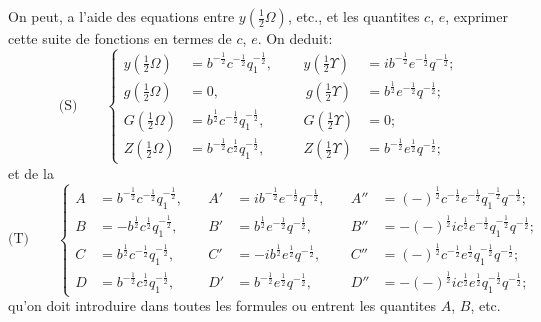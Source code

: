 \documentclass[11pt,a4paper]{article}
\begin{document}
On peut, a l'aide des equations entre $y\left(\frac{1}{2}\Omega\right)$, etc., et les quantites $c$, $e$, exprimer
cette suite de fonctions en termes de $c$, $e$. On deduit:
\begin{equation*}
\text{(S)}\qquad
\left\{
\begin{alignedat}{2}
y\left(\tfrac{1}{2}\Omega\right) &= b^{-\frac{1}{2}} c^{-\frac{1}{2}} q_1^{-\frac{1}{2}},\quad
&y\left(\tfrac{1}{2}\Upsilon\right) &= ib^{-\frac{1}{2}} e^{-\frac{1}{2}} q^{-\frac{1}{2}};\\
g\left(\tfrac{1}{2}\Omega\right) &= 0,\qquad\qquad\quad\,
&\, g\left(\tfrac{1}{2}\Upsilon\right) &= b^{\frac{1}{2}} e^{-\frac{1}{2}} q^{-\frac{1}{2}};\\
G\left(\tfrac{1}{2}\Omega\right) &= b^{\frac{1}{2}} c^{-\frac{1}{2}} q_1^{-\frac{1}{2}},\quad
&G\left(\tfrac{1}{2}\Upsilon\right) &= 0;\\
Z\left(\tfrac{1}{2}\Omega\right) &= b^{-\frac{1}{2}} c^{\frac{1}{2}} q_1^{-\frac{1}{2}},\quad
&Z\left(\tfrac{1}{2}\Upsilon\right) &= b^{-\frac{1}{2}} e^{\frac{1}{2}} q^{-\frac{1}{2}};
\end{alignedat}
\right.
\end{equation*}
et de la
\begin{equation*}
\text{(T)}\qquad
\left\{
\begin{alignedat}{3}
A &= b^{-\frac{1}{2}} c^{-\frac{1}{2}} q_1^{-\frac{1}{2}},\quad &A' &= ib^{-\frac{1}{2}} e^{-\frac{1}{2}} q^{-\frac{1}{2}},\quad &A'' &= (-)^{\frac{1}{2}} c^{-\frac{1}{2}} e^{-\frac{1}{2}} q_1^{-\frac{1}{2}} q^{-\frac{1}{2}};\\
B &= -b^{\frac{1}{2}} c^{\frac{1}{2}} q_1^{-\frac{1}{2}},\quad &B' &= b^{\frac{1}{2}} e^{-\frac{1}{2}} q^{-\frac{1}{2}},\quad &B'' &= -(-)^{\frac{1}{2}} ic^{\frac{1}{2}} e^{-\frac{1}{2}} q_1^{-\frac{1}{2}} q^{-\frac{1}{2}};\\
C &= b^{\frac{1}{2}} c^{-\frac{1}{2}} q_1^{-\frac{1}{2}},\quad &C' &= -ib^{\frac{1}{2}} e^{\frac{1}{2}} q^{-\frac{1}{2}},\quad &C'' &= (-)^{\frac{1}{2}} c^{-\frac{1}{2}} e^{\frac{1}{2}} q_1^{-\frac{1}{2}} q^{-\frac{1}{2}};\\
D &= b^{-\frac{1}{2}} c^{\frac{1}{2}} q_1^{-\frac{1}{2}},\quad &D' &= b^{-\frac{1}{2}} e^{\frac{1}{2}} q^{-\frac{1}{2}},\quad &D'' &= -(-)^{\frac{1}{2}} ic^{\frac{1}{2}} e^{\frac{1}{2}} q_1^{-\frac{1}{2}} q^{-\frac{1}{2}};
\end{alignedat}
\right.
\end{equation*}
qu'on doit introduire dans toutes les formules ou entrent les quantites $A$, $B$, etc.
\end{document}
